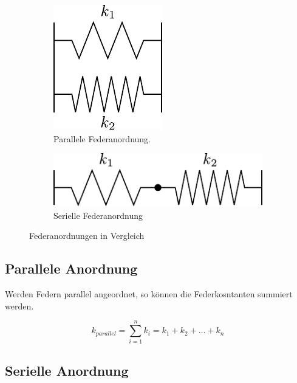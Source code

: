 \begin{figure}[h!]
	\centering
	\begin{subfigure}[c]{0.45\textwidth}
		\includegraphics[scale=0.75]{feder-parallel.pdf}
		\caption{Parallele Federanordnung.}
		\label{fig:feder-parallel}
	\end{subfigure}
	\begin{subfigure}[c]{0.45\textwidth}
		\includegraphics[scale=0.75]{feder-seriell.pdf}
		\caption{Serielle Federanordnung}
		\label{fig:feder-seriell}
	\end{subfigure}
	\caption{Federanordnungen in Vergleich}
	\label{fig:federanordnungen}
\end{figure}

\subsection{Parallele Anordnung}

\noindent
Werden Federn parallel angeordnet, so können die Federkosntanten summiert 
werden.

\[ \boxed{k_{parallel} 
	= \sum_{i=1}^n k_i 
	= k_1 + k_2 + \dots + k_n
} \]

\subsection{Serielle Anordnung}


